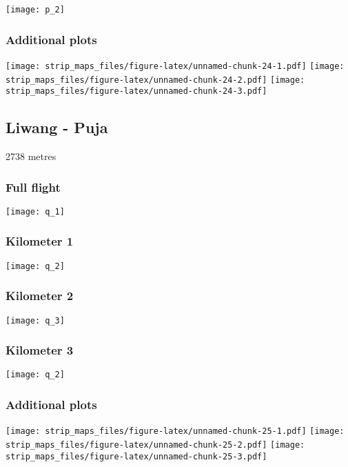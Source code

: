 \documentclass[]{article}
\begin{document}
\texttt{[image: p\_2]}

\subsubsection{Additional plots}\label{additional-plots-15}

\texttt{[image: strip\_maps\_files/figure-latex/unnamed-chunk-24-1.pdf]}
\texttt{[image: strip\_maps\_files/figure-latex/unnamed-chunk-24-2.pdf]}
\texttt{[image: strip\_maps\_files/figure-latex/unnamed-chunk-24-3.pdf]}

\newpage

\subsection{Liwang - Puja}\label{liwang---puja}

2738 metres

\subsubsection{Full flight}\label{full-flight-16}

\texttt{[image: q\_1]}

\subsubsection{Kilometer 1}\label{kilometer-1-16}

\texttt{[image: q\_2]}

\subsubsection{Kilometer 2}\label{kilometer-2-16}

\texttt{[image: q\_3]}

\subsubsection{Kilometer 3}\label{kilometer-3-16}

\texttt{[image: q\_2]}

\subsubsection{Additional plots}\label{additional-plots-16}

\texttt{[image: strip\_maps\_files/figure-latex/unnamed-chunk-25-1.pdf]}
\texttt{[image: strip\_maps\_files/figure-latex/unnamed-chunk-25-2.pdf]}
\texttt{[image: strip\_maps\_files/figure-latex/unnamed-chunk-25-3.pdf]}
\end{document}
